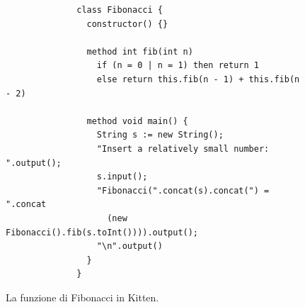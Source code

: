 \begin{figure}[t]
\begin{verbatim}
              class Fibonacci {
                constructor() {}

                method int fib(int n)
                  if (n = 0 | n = 1) then return 1
                  else return this.fib(n - 1) + this.fib(n - 2)

                method void main() {
                  String s := new String();
                  "Insert a relatively small number: ".output();
                  s.input();
                  "Fibonacci(".concat(s).concat(") = ".concat
                    (new Fibonacci().fib(s.toInt()))).output();
                  "\n".output()
                }
              }
\end{verbatim}
\caption{La funzione di Fibonacci in Kitten.}\label{fig:fibonacci}
\end{figure}
%
